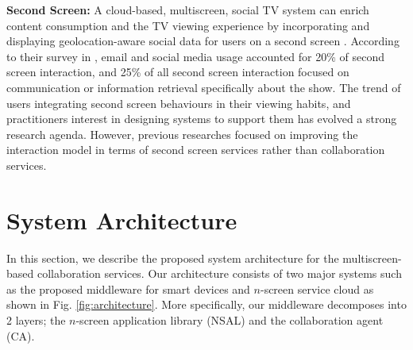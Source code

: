 \documentclass[conference]{IEEEtran}
\begin{document}
\noindent
\textbf{Second Screen:} 
A cloud-based, multiscreen, social TV system can enrich content consumption and the TV viewing experience by incorporating and displaying geolocation-aware social data for users on a second screen \cite{Longo:2013}.
According to their survey in \cite{Nandakumar:2014}, email and social media usage accounted for 20\% of second screen interaction, and 25\% of all second screen interaction focused on communication or information retrieval specifically about the show. 
The trend of users integrating second screen behaviours in their viewing habits, and practitioners interest in designing systems to support them has evolved a strong research agenda. However, previous researches focused on improving the interaction model in terms of second screen services rather than collaboration services.

\section{System Architecture}
    \label{sc:Architecture}
    In this section, we describe the proposed system architecture for the multiscreen-based collaboration services.
    Our architecture consists of two major systems such as the proposed middleware for smart devices and $n$-screen service cloud as shown in Fig. \ref{fig:architecture}. More specifically, our middleware decomposes into 2 layers;  the $n$-screen application library (NSAL) and the collaboration agent (CA).  
\end{document}
